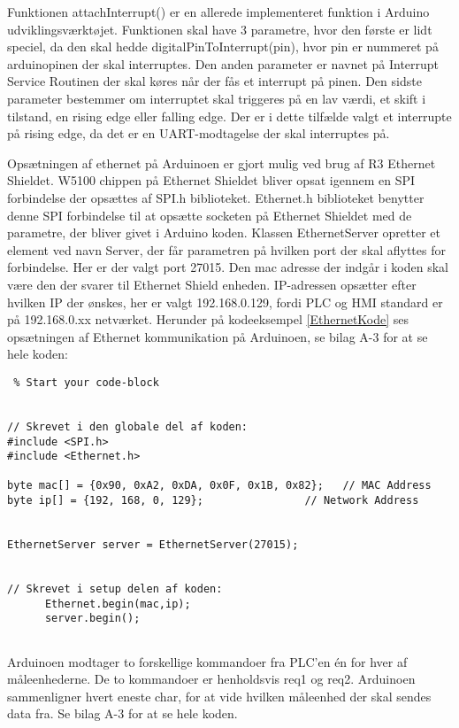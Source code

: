 Funktionen attachInterrupt() er en allerede implementeret funktion i Arduino udviklingsværktøjet. Funktionen skal have 3 parametre, hvor den første er lidt speciel, da den skal hedde digitalPinToInterrupt(pin), hvor pin er nummeret på arduinopinen der skal interruptes. Den anden parameter er navnet på Interrupt Service Routinen der skal køres når der fås et interrupt på pinen. Den sidste parameter bestemmer om interruptet skal triggeres på en lav værdi, et skift i tilstand, en rising edge eller falling edge. Der er i dette tilfælde valgt et interrupte på rising edge, da det er en UART-modtagelse der skal interruptes på. 

Opsætningen af ethernet på Arduinoen er gjort mulig ved brug af R3 Ethernet Shieldet. W5100 chippen på Ethernet Shieldet bliver opsat igennem en SPI forbindelse der opsættes af SPI.h biblioteket. Ethernet.h \cite{Ethernet} biblioteket benytter denne SPI forbindelse til at opsætte socketen på Ethernet Shieldet med de parametre, der bliver givet i Arduino koden. Klassen EthernetServer opretter et element ved navn Server, der får parametren på hvilken port der skal aflyttes for forbindelse. Her er der valgt port 27015. Den mac adresse der indgår i koden skal være den der svarer til Ethernet Shield enheden. IP-adressen opsætter efter hvilken IP der ønskes, her er valgt 192.168.0.129, fordi PLC og HMI standard er på 192.168.0.xx netværket. Herunder på kodeeksempel \ref{EthernetKode} ses opsætningen af Ethernet kommunikation på Arduinoen, se bilag A-3 for at se hele koden:


\begin{lstlisting} % Start your code-block


// Skrevet i den globale del af koden:
#include <SPI.h>
#include <Ethernet.h>

byte mac[] = {0x90, 0xA2, 0xDA, 0x0F, 0x1B, 0x82};   // MAC Address
byte ip[] = {192, 168, 0, 129};                // Network Address


EthernetServer server = EthernetServer(27015);


// Skrevet i setup delen af koden:
      Ethernet.begin(mac,ip);
      server.begin();


\end{lstlisting}

Arduinoen modtager to forskellige kommandoer fra PLC'en én for hver af måleenhederne. De to kommandoer er henholdsvis req1 og req2. Arduinoen sammenligner hvert eneste char, for at vide hvilken måleenhed der skal sendes data fra. Se bilag A-3 for at se hele koden. 

